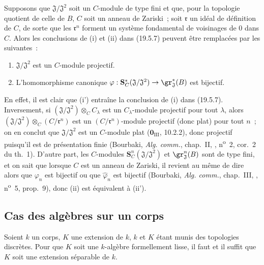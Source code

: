 \begin{remark}[19.5.8]
\label{0.19.5.8-fr}
Supposons que $\mathfrak J/\mathfrak J^2$ soit un $C$-module de type fini et
que, pour la topologie quotient de celle de $B$, $C$ soit un anneau de Zariski~;
soit $\mathfrak r$ un idéal de définition de $C$, de sorte que les
$\mathfrak r^n$ forment un système fondamental de voisinages de $0$ dans $C$.
Alors les conclusions de (i) et (ii) dans (19.5.7) peuvent être remplacées par
les suivantes~:
\begin{enumerate}
  \item[\rm(i')] $\mathfrak J/\mathfrak J^2$ est un $C$-module projectif.
  \item[\rm(ii')] L'homomorphisme canonique
  $\varphi:\mathbf S_C^*(\mathfrak J/\mathfrak J^2)
  \to\gr_{\mathfrak J}^*(B)$ est bijectif.
\end{enumerate}
En effet, il est clair que (i') entraîne la conclusion de (i) dans (19.5.7).
Inversement, si $(\mathfrak J/\mathfrak J^2)\otimes_C C_\lambda$ est un
$C_\lambda$-module projectif pour tout $\lambda$, alors
$(\mathfrak J/\mathfrak J^2)\otimes_C(C/\mathfrak r^n)$ est un
$(C/\mathfrak r^n)$-module projectif (donc plat) pour tout $n$~; on en conclut
que $\mathfrak J/\mathfrak J^2$ est un $C$-module plat
($\mathbf 0_{\mathrm{III}}$, 10.2.2), donc projectif puisqu'il est de
présentation finie (Bourbaki, \emph{Alg. comm.}, chap.~II, ,
n\textsuperscript{o}~2, cor.~2 du th.~1). D'autre part, les $C$-modules
$\mathbf S_C^n(\mathfrak J/\mathfrak J^2)$ et $\gr_{\mathfrak J}^n(B)$ sont
de type fini, et on sait que lorsque $C$ est un anneau de Zariski, il revient
au même de dire alors que $\varphi_n$ est bijectif ou que
$\widehat\varphi_n$ est bijectif (Bourbaki, \emph{Alg. comm.}, chap.~III,
, n\textsuperscript{o}~5, prop.~9), donc (ii) est équivalent à
(ii').
\end{remark}

\subsection{Cas des algèbres sur un corps}
\label{subsection:0.19.6-fr}

\begin{theorem}[19.6.1) (Cohen]
\label{0.19.6.1-fr}
Soient $k$ un corps, $K$ une extension de $k$, $k$ et $K$
étant munis des topologies discrètes. Pour que $K$ soit une $k$-algèbre
formellement lisse, il faut et il suffit que $K$ soit une extension séparable
de $k$.
\end{theorem}


